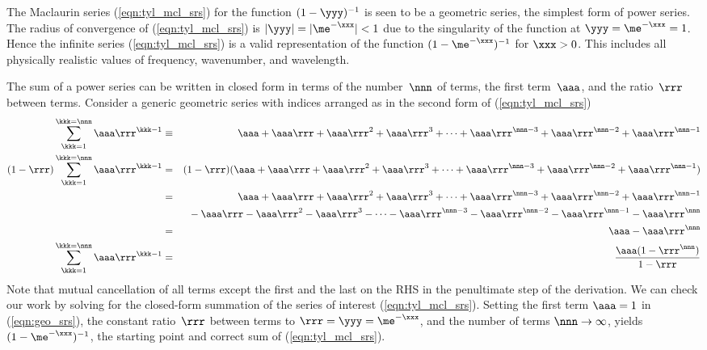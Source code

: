 \documentclass[12pt]{article}
\begin{document}
The Maclaurin series (\ref{eqn:tyl_mcl_srs}) for the function $(1 - \yyy)^{-1}$ is seen to be a geometric series, the simplest form of power series.
The radius of convergence of (\ref{eqn:tyl_mcl_srs}) is $|\yyy| = |\me^{-\xxx}| < 1$ due to the singularity of the function at $\yyy = \me^{-\xxx} = 1$.
Hence the infinite series (\ref{eqn:tyl_mcl_srs}) is a valid representation of the function $(1 - \me^{-\xxx})^{-1}$ for $\xxx > 0$.
This includes all physically realistic values of frequency, wavenumber, and wavelength.

The sum of a power series can be written in closed form in terms of the number~$\nnn$ of terms, the first term~$\aaa$, and the ratio~$\rrr$ between terms.
Consider a generic geometric series with indices arranged as in the second form of (\ref{eqn:tyl_mcl_srs})
\begin{eqnarray}
\sum_{\kkk=1}^{\kkk=\nnn} \aaa\rrr^{\kkk - 1}
& \equiv & \aaa + \aaa\rrr + \aaa\rrr^{2} + \aaa\rrr^{3} + \cdots + \aaa\rrr^{\nnn-3} + \aaa\rrr^{\nnn-2} + \aaa\rrr^{\nnn-1} \nonumber \\ 
(1 - \rrr)\sum_{\kkk=1}^{\kkk=\nnn} \aaa\rrr^{\kkk - 1} 
& = &
(1 - \rrr) ( \aaa + \aaa\rrr + \aaa\rrr^{2} + \aaa\rrr^{3} + \cdots + \aaa\rrr^{\nnn-3} + \aaa\rrr^{\nnn-2} + \aaa\rrr^{\nnn-1} ) \nonumber \\
& = &
\aaa + \aaa\rrr + \aaa\rrr^{2} + \aaa\rrr^{3} + \cdots + \aaa\rrr^{\nnn-3} +\aaa\rrr^{\nnn-2} + \aaa\rrr^{\nnn-1} \nonumber \\
& & {} - \aaa\rrr - \aaa\rrr^{2} - \aaa\rrr^{3} - \cdots - \aaa\rrr^{\nnn-3} -\aaa\rrr^{\nnn-2} - \aaa\rrr^{\nnn-1} - \aaa\rrr^{\nnn} \nonumber \\
& = & \aaa - \aaa\rrr^{\nnn} \nonumber \\
\sum_{\kkk=1}^{\kkk=\nnn} \aaa\rrr^{\kkk - 1}
& = & \frac{\aaa (1 - \rrr^{\nnn})}{1 - \rrr}
\label{eqn:geo_srs}
\end{eqnarray}
Note that mutual cancellation of all terms except the first and the last on the RHS in the penultimate step of the derivation.
We can check our work by solving for the closed-form summation of the series of interest (\ref{eqn:tyl_mcl_srs}).
Setting the first term $\aaa = 1$ in (\ref{eqn:geo_srs}), the constant ratio~$\rrr$ between terms to $\rrr = \yyy = \me^{-\xxx}$, and the number of terms $\nnn \rightarrow \infty$, yields $(1-\me^{-\xxx})^{-1}$, the starting point and correct sum of (\ref{eqn:tyl_mcl_srs}).
\end{document}
